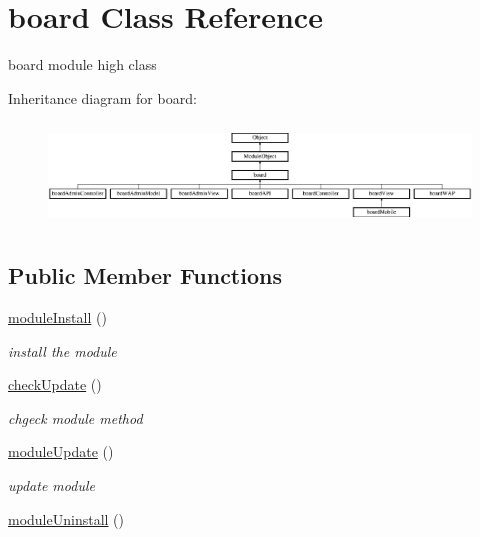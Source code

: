 \hypertarget{classboard}{\section{board Class Reference}
\label{classboard}
}


board module high class  


Inheritance diagram for board\+:\begin{figure}[H]
\begin{center}
\leavevmode
\includegraphics[height=2.777778cm]{classboard}
\end{center}
\end{figure}
\subsection*{Public Member Functions}
\begin{DoxyCompactItemize}
\item 
\hyperlink{classboard_abcf015f709c0c2809dba55f74f059ebc}{module\+Install} ()
\begin{DoxyCompactList}\small\item\em install the module \end{DoxyCompactList}\item 
\hyperlink{classboard_a64506bb5293024e146d0ff7deeb27684}{check\+Update} ()
\begin{DoxyCompactList}\small\item\em chgeck module method \end{DoxyCompactList}\item 
\hyperlink{classboard_ab6b25ead0f4ec6d25f60338c7cdd33b5}{module\+Update} ()
\begin{DoxyCompactList}\small\item\em update module \end{DoxyCompactList}\item 
\hyperlink{classboard_a1e6008fcf4e2a540370e242246b8e721}{module\+Uninstall} ()
\end{DoxyCompactItemize}
